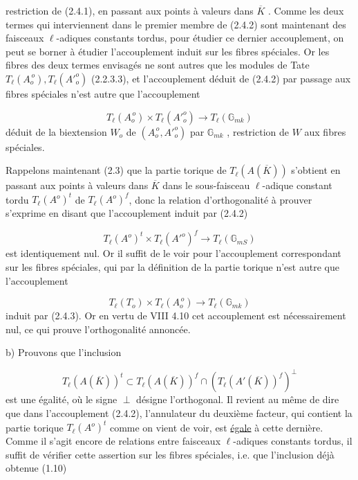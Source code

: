 
restriction de (2.4.1), en passant aux points à valeurs dans $\overline{K}$ . Comme les deux termes qui interviennent dans le premier membre de (2.4.2) sont maintenant des faisceaux $\ell$-adiques constants tordus, pour étudier ce dernier accouplement, on peut se borner à étudier l'accouplement induit sur les fibres spéciales. Or les fibres des deux termes envisagés ne sont autres que les modules de Tate $T_{\ell}(A_{o}^{\,o}),T_{\ell}({A'}^{o}_{o})$ (2.2.3.3), et l'accouplement déduit de (2.4.2) par passage aux fibres spéciales n'est autre que l'accouplement

\begin{equation}\tag{2.4.3}
T_{\ell}(A_{o}^{\,o}) \times T_{\ell}({A'}^{o}_{o}) \longrightarrow T_{\ell}(\mathbb{G}_{mk})
\end{equation}
déduit de la biextension $W_{o}$ de $(A_{o}^{\,o},{A'}^{o}_{o})$ par $\mathbb{G}_{mk}$ , restriction de $W$ aux fibres spéciales.

Rappelons maintenant (2.3) que la partie torique de $T_{\ell}(A(\overline{K}))$ s'obtient en passant aux points à valeurs dans $\overline{K}$ dans le sous-faisceau $\ell$-adique constant tordu $T_{\ell}(A^{o})^{t}$ de $T_{\ell}(A^{o})^{f}$, donc la relation d'orthogonalité à prouver s'exprime en disant que l'accouplement induit par (2.4.2)

\begin{equation}\tag{2.4.4}
T_{\ell}(A^{o})^{t} \times T_{\ell}({A'}^{o})^{f} \longrightarrow T_{\ell}(\mathbb{G}_{mS})
\end{equation}
est identiquement nul. Or il suffit de le voir pour l'accouplement correspondant sur les fibres spéciales, qui par la définition de la partie torique n'est autre que l'accouplement

\begin{equation}\tag{2.4.5}
T_{\ell}(T_{o}) \times T_{\ell}(A_{o}^{\,o}) \longrightarrow T_{\ell}(\mathbb{G}_{mk})
\end{equation}
induit par (2.4.3). Or en vertu de VIII 4.10 cet accouplement est nécessairement nul, ce qui prouve l'orthogonalité annoncée.



b)  Prouvons que l'inclusion

\begin{equation}\tag{2.4.6}
T_{\ell}(A(\overline{K}))^{t} \subset T_{\ell}(A(\overline{K}))^{f} \cap (T_{\ell}(A'(\overline{K}))^{f})^{\perp}
\end{equation}
est une égalité, où le signe $\perp$ désigne l'orthogonal. Il revient au même de dire que dans l'accouplement (2.4.2), l'annulateur du deuxième facteur, qui contient la partie torique $T_{\ell}(A^{o})^{t}$ comme on vient de voir, est \underline{égale} à cette dernière. Comme il s'agit encore de relations entre faisceaux $\ell$-adiques constants tordus, il suffit de vérifier cette assertion sur les fibres spéciales, i.e. que l'inclusion déjà obtenue (1.10)

